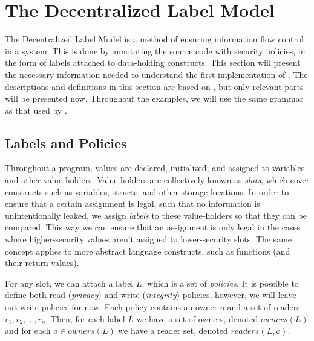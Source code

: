 
\newcommand{\labelof}[1]{\underline{#1}}
\newcommand{\dlmc}[1]{\lstinline[style=dlmc]{#1}}
\newcommand{\dlmactsfor}{\dlmc{if\_acts\_for}}
\newcommand{\dlmdeclassify}{\dlmc{declassify}}
\newcommand{\dlmpc}{$\underline{pc}$}
\newcommand{\mathcomment}[1]{\color{green!50!black}{#1}}

\section{The Decentralized Label Model}
The Decentralized Label Model \cite{myers1997, myers1998, myers2000} is a method of ensuring information flow control in a system.
This is done by annotating the source code with security policies, in the form of labels attached to data-holding constructs.
This section will present the necessary information needed to understand the first implementation of \thetool.
The descriptions and definitions in this section are based on \cite{myers1997, myers1998, myers2000}, but only relevant parts will be presented now.
Throughout the examples, we will use the same grammar as that used by \thetool.

\subsection{Labels and Policies}
Throughout a program, values are declared, initialized, and assigned to variables and other value-holders.
Value-holders are collectively known as \emph{slots}, which cover constructs such as variables, structs, and other storage locations.
In order to ensure that a certain assignment is legal, such that no information is unintentionally leaked, we assign \emph{labels} to these value-holders so that they can be compared.
This way we can ensure that an assignment is only legal in the cases where higher-security values aren't assigned to lower-security slots.
The same concept applies to more abstract language constructs, such as functions (and their return values).

For any slot, we can attach a label $L$, which is a set of \emph{policies}.
It is possible to define both read (\emph{privacy}) and write (\emph{integrity}) policies, however, we will leave out write policies for now.
Each policy contains an owner $o$ and a set of readers $r_1,r_2,\dots,r_n$.
Then, for each label $L$ we have a set of owners, denoted $owners(L)$ and for each $o \in owners(L)$ we have a reader set, denoted $readers(L, o)$.

